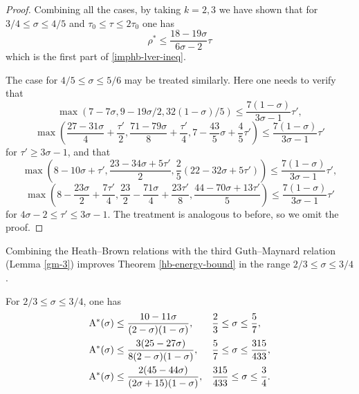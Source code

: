\begin{proof}
Combining all the cases, by taking $k= 2,3$ we have shown that for $3/4 \le \sigma \le 4/5$ and $\tau_0 \le \tau \le 2\tau_0$ one has
\[
\rho^* \le \frac{18 - 19\sigma}{6\sigma - 2}\tau
\]
which is the first part of \eqref{imphb-lver-ineq}.

The case for $4/5 \le \sigma \le 5/6$ may be treated similarly. Here one needs to verify that
\[
\max(7 - 7\sigma, 9 - 19\sigma/2, 32(1 - \sigma)/5) \le \frac{7(1 - \sigma)}{3\sigma - 1}\tau',
\]
\[
\max\left(\frac{27-31\sigma}{4} + \frac{\tau'}{2}, \frac{71-79\sigma}{8}+\frac{\tau'}{4}, 7-\frac{43}{5}\sigma + \frac{4}{5}\tau'\right) \le \frac{7(1 - \sigma)}{3\sigma - 1}\tau'
\]
for $\tau' \ge 3\sigma - 1$, and that
\[
\max\left(8 -10\sigma + \tau',\frac{23 - 34\sigma + 5\tau'}{2}, \frac{2}{5}(22 - 32\sigma +  5\tau')\right) \le \frac{7(1 - \sigma)}{3\sigma - 1}\tau',
\]
\[
\max\left(8 - \frac{23\sigma}{2} + \frac{7\tau'}{4}, \frac{23}{2} - \frac{71\sigma}{4} + \frac{23\tau'}{8}, \frac{44 - 70\sigma + 13\tau'}{5}\right) \le \frac{7(1 - \sigma)}{3\sigma - 1}\tau'
\]
for $4\sigma - 2 \le \tau' \le 3\sigma - 1$. The treatment is analogous to before, so we omit the proof.
\end{proof}

Combining the Heath--Brown relations with the third Guth--Maynard relation (Lemma \ref{gm-3}) improves Theorem \ref{hb-energy-bound} in the range $2/3 \le \sigma \le 3/4$.

\begin{theorem}\label{imp-energy-bound1}
For $2/3 \le \sigma \le 3/4$, one has
\begin{align*}
\mathrm{A}^*(\sigma) &\le \frac{10 - 11\sigma}{(2 - \sigma)(1 - \sigma)}, && \frac{2}{3} \le \sigma \le \frac{5}{7},\\
\mathrm{A}^*(\sigma) &\le \frac{3(25 - 27\sigma)}{8(2 - \sigma)(1 - \sigma)}, && \frac{5}{7} \le \sigma \le \frac{315}{433},\\
\mathrm{A}^*(\sigma) &\le \frac{2(45 - 44\sigma)}{(2\sigma + 15)(1 - \sigma)}, && \frac{315}{433} \le \sigma \le \frac{3}{4}.
\end{align*}
\end{theorem}

\derived
{}

